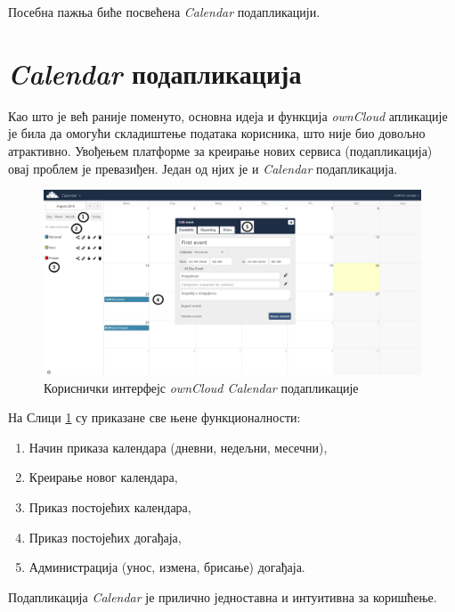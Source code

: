 Посебна пажња биће посвећена \textit{Calendar} подапликацији.

\section{\textit{Calendar} подапликација}

Као што је већ раније поменуто, основна идеја и функција \textit{ownCloud} апликације је била да омогући складиштење података корисника, што није био довољно атрактивно. Увођењем платформе за креирање нових сервиса (подапликација) овај проблем је превазиђен. Један од нјих је и \textit{Calendar} подапликација.

\begin{figure}[H]
	\centering
	\includegraphics[scale=0.4]{slike/ownCloudCalendarDetails.png}
	\caption{Кориснички интерфејс \textit{ownCloud Calendar} подапликације}
	\label{fig:own_cloud_calendar_details}
\end{figure}

На Слици \ref{fig:own_cloud_calendar_details} су приказане све њене функционалности:
\begin{enumerate}
	\item Начин приказа календара (дневни, недељни, месечни),
	\item Креирање новог календара,
	\item Приказ постојећих календара,
	\item Приказ постојећих догађаја,
	\item Администрација (унос, измена, брисање) догађаја.
\end{enumerate}

Подапликација \textit{Calendar} је прилично једноставна и интуитивна за коришћење.